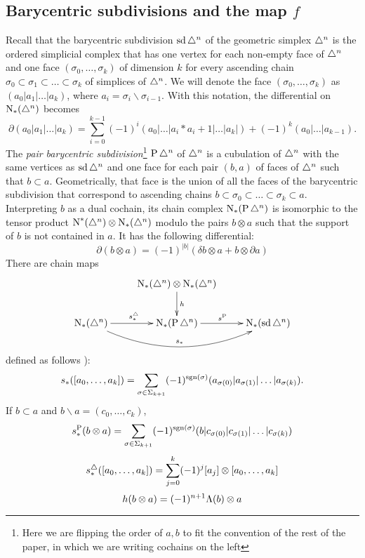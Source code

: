 \subsection{Barycentric subdivisions and the map $f$} Recall that the barycentric subdivision $\operatorname{sd} \triangle^n$ of the geometric simplex $\triangle^n$ is the ordered simplicial complex that has one vertex for each non-empty face of $\triangle^n$ and one face $(\sigma_0,\ldots,\sigma_k)$ of dimension $k$ for every ascending chain $\sigma_0\subset \sigma_1\subset\ldots \subset \sigma_k$ of simplices of $\triangle^n$. We will denote the face $(\sigma_0,\ldots,\sigma_k)$ as $(a_0|a_1|\ldots|a_k)$, where $a_i = \sigma_i\smallsetminus \sigma_{i-1}$. With this notation, the differential on $\operatorname{N}_*(\triangle^n)$ becomes
\[
\partial(a_0|a_1|\ldots|a_k) = \sum_{i=0}^{k-1} (-1)^i(a_0|\ldots|a_i*a_i+1|\ldots |a_k|) + (-1)^k (a_0|\ldots|a_{k-1}).
\]
The \emph{pair barycentric subdivision}\footnote{Here we are flipping the order of $a,b$ to fit the convention of the rest of the paper, in which we are writing cochains on the left} $\operatorname{P} \triangle^n$ of $\triangle^n$ is a cubulation of $\triangle^n$ with the same vertices as $\operatorname{sd} \triangle^n$ and one face for each pair $(b,a)$ of faces of $\triangle^n$ such that $b\subset a$. Geometrically, that face is the union of all the faces of the barycentric subdivision that correspond to ascending chains $b\subset \sigma_0\subset \ldots\subset \sigma_k\subset a$. Interpreting $b$ as a dual cochain, its chain complex $\operatorname{N}_*(\operatorname{P} \triangle^n)$ is isomorphic to the tensor product $\operatorname{N}^*(\triangle^n)\otimes \operatorname{N}_*(\triangle^n)$ modulo the pairs $b\otimes a$ such that the support of $b$ is not contained in $a$. It has the following differential:
\[\partial(b\otimes a) = (-1)^{|b|}(\delta b\otimes a + b\otimes \partial a)\]
There are chain maps
\[
\xymatrix{
	&\chains_*(\simplex^n)\otimes \chains_*(\simplex^n)\ar[d]^h& \\
	\chains_*(\simplex^n)\ar[r]^{s_*^{\simplex}}\ar@/_2.0pc/[rr]^{s_*} & \chains_*(\Psd \simplex^n)\ar[r]^{s^{\Psd}} & \chains_*(\sd\simplex^n)
}
\]
defined as follows \cite[\P 1.12]{Rounds2010}):
\[
s_*([a_0,\ldots,a_k]) = \sum_{\sigma\in \Sigma_{k+1}} (-1)^{\operatorname*{sgn}(\sigma)}(a_{\sigma(0)}|a_{\sigma(1)}|\ldots|a_{\sigma(k)}).
\]
If $b\subset a$ and $b\smallsetminus a = (c_0,\ldots,c_{k})$,
\[
s_*^{\operatorname{P}}(b\otimes a) = \sum_{\sigma\in \Sigma_{k+1}} (-1)^{\operatorname*{sgn}(\sigma)} (b|c_{\sigma(0)}|c_{\sigma(1)}|\ldots|c_{\sigma(k)})
\]
\[
s_*^{\triangle}([a_0,\ldots,a_k]) = \sum_{j=0}^k (-1)^j[a_j]\otimes [a_0,\ldots,a_k]
\]
\[
h( b\otimes a) = (-1)^{n+1}\Lambda(b)\otimes a
\]

